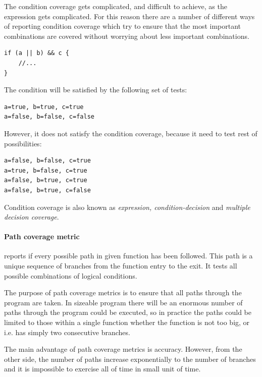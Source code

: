 The condition coverage gets complicated, and difficult to achieve, as the expression gets complicated. For this reason there are a number of different ways of reporting condition coverage which try to ensure that the most important combinations are covered without worrying about less important combinations.

\begin{lstlisting}[caption=Complex conditional coverage, label=lst:conditional2]
if (a || b) && c {
	//...
}
\end{lstlisting}

The condition will be satisfied by the following set of tests:
\begin{verbatim} 
a=true, b=true, c=true
a=false, b=false, c=false
\end{verbatim} 

However, it does not satisfy the condition coverage, because it need to test rest of possibilities:
\begin{verbatim}
a=false, b=false, c=true
a=true, b=false, c=true
a=false, b=true, c=true
a=false, b=true, c=false
\end{verbatim}

Condition coverage is also known as \textit{expression, condition-decision} and \textit{multiple decision coverage}.
\paragraph{Path coverage metric} reports if every possible path in given function has been followed. This path is a unique sequence of branches from the function entry to the exit. It tests all possible combinations of logical conditions. 

The purpose of path coverage metrics is to ensure that all paths through the program are taken. In sizeable program there will be an enormous number of paths through the program could be executed, so in practice the paths could be limited to those within a single function whether the function is not too big, or i.e. has simply two consecutive branches.

The main advantage of path coverage metrics is accuracy. However, from the other side, the number of paths increase exponentially to the number of branches and it is impossible to exercise all of time in small unit of time.  

